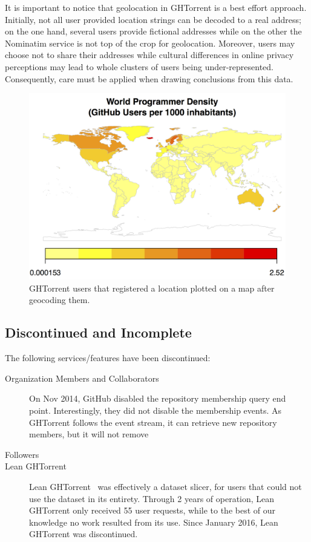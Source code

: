 \documentclass{sig-alternate}
\begin{document}
It is important to notice that geolocation in GHTorrent is a best effort
approach. Initially, not all user provided location strings can be decoded to a
real address; on the one hand, several users provide fictional addresses while
on the other the Nominatim service is not top of the crop for geolocation.
Moreover, users may choose not to share their addresses while cultural
differences in online privacy perceptions may lead to whole clusters of users
being under-represented. Consequently, care must be applied when drawing
conclusions from this data.

\begin{figure}
  \begin{center}
    \includegraphics[scale=0.2]{dev-map.png}
  \end{center}
  \caption{GHTorrent users that registered a location plotted on a map after
  geocoding them.}
  \label{fig:dev-map}
\end{figure}

\subsection{Discontinued and Incomplete}

The following services/features have been discontinued:

\begin{description}

  \item[Organization Members and Collaborators] On Nov 2014, GitHub disabled
    the repository membership query end point. Interestingly, they did not
    disable the membership events. As GHTorrent follows the event stream,
    it can retrieve new repository members, but it will not remove 

  \item[Followers] 

  \item[Lean GHTorrent] Lean GHTorrent~\cite{GVSZ14} was effectively a dataset
    slicer, for users that could not use the dataset in its entirety. Through 2
    years of operation, Lean GHTorrent only received 55 user requests, while to
    the best of our knowledge no work resulted from its use. Since January 2016,
    Lean GHTorrent was discontinued.

\end{description}
\end{document}
